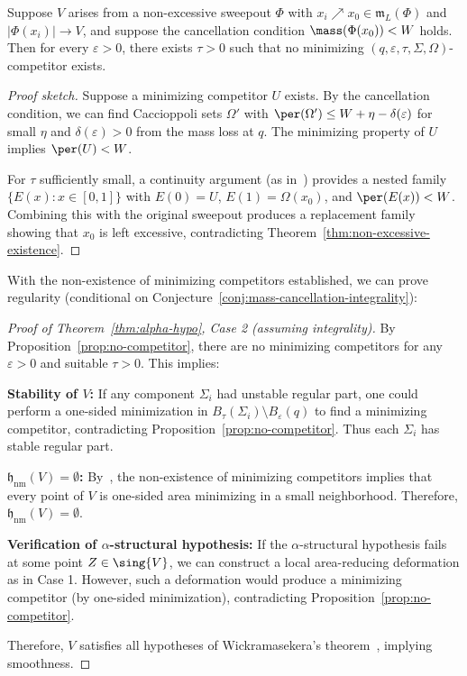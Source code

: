 \begin{proposition}\label{prop:no-competitor}
Suppose $V$ arises from a non-excessive sweepout $\Phi$ with $x_i \nearrow x_0 \in \mathfrak{m}_L(\Phi)$
and $|\Phi(x_i)| \to V$, and suppose the cancellation condition $\mass(\Phi(x_0)) < W$ holds. Then for
every $\varepsilon > 0$, there exists $\tau > 0$ such that no minimizing
$(q, \varepsilon, \tau, \Sigma, \Omega)$-competitor exists.
\end{proposition}

\begin{proof}[Proof sketch]
Suppose a minimizing competitor $U$ exists. By the cancellation condition, we can find Caccioppoli sets
$\Omega'$ with $\per(\Omega') \leq W + \eta - \delta(\varepsilon)$ for small $\eta$ and $\delta(\varepsilon) > 0$
from the mass loss at $q$. The minimizing property of $U$ implies $\per(U) < W$.

For $\tau$ sufficiently small, a continuity argument (as in~\cite[Lemma 3.3]{CLS22}) provides a nested
family $\{E(x) : x \in [0,1]\}$ with $E(0) = U$, $E(1) = \Omega(x_0)$, and $\per(E(x)) < W$. Combining
this with the original sweepout produces a replacement family showing that $x_0$ is left excessive,
contradicting Theorem~\ref{thm:non-excessive-existence}.
\end{proof}

With the non-existence of minimizing competitors established, we can prove regularity (conditional on Conjecture~\ref{conj:mass-cancellation-integrality}):

\begin{proof}[Proof of Theorem~\ref{thm:alpha-hypo}, Case 2 (assuming integrality)]
By Proposition~\ref{prop:no-competitor}, there are no minimizing competitors for any $\varepsilon > 0$ and
suitable $\tau > 0$. This implies:

\textbf{Stability of $V$:} If any component $\Sigma_i$ had unstable regular part, one could perform a one-sided
minimization in $B_\tau(\Sigma_i) \setminus B_\varepsilon(q)$ to find a minimizing competitor,
contradicting Proposition~\ref{prop:no-competitor}. Thus each $\Sigma_i$ has stable regular part.

\textbf{$\mathfrak{h}_{\mathrm{nm}}(V) = \emptyset$:} By~\cite[Proposition~3.7]{CLS22}, the non-existence
of minimizing competitors implies that every point of $V$ is one-sided area minimizing in a small
neighborhood. Therefore, $\mathfrak{h}_{\mathrm{nm}}(V) = \emptyset$.

\textbf{Verification of $\alpha$-structural hypothesis:} If the $\alpha$-structural hypothesis fails at
some point $Z \in \sing{V}$, we can construct a local area-reducing deformation as in Case 1. However,
such a deformation would produce a minimizing competitor (by one-sided minimization), contradicting
Proposition~\ref{prop:no-competitor}.

Therefore, $V$ satisfies all hypotheses of Wickramasekera's theorem~\cite{Wic14}, implying smoothness.
\end{proof}

